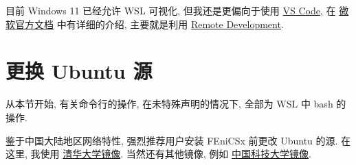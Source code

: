 \documentclass[fontset=founder]{ctexrep}
\begin{document}
目前 Windows 11 已经允许 WSL 可视化,
但我还是更偏向于使用
\href{https://code.visualstudio.com/}{VS Code},
在%
\href{https://learn.microsoft.com/zh-cn/windows/wsl/tutorials/wsl-vscode}{微软官方文档}%
中有详细的介绍,
主要就是利用
\href{https://marketplace.visualstudio.com/items?itemName=ms-vscode-remote.vscode-remote-extensionpack}{Remote Development}.

\section{更换 Ubuntu 源}\label{sec:source}

从本节开始,
有关命令行的操作,
在未特殊声明的情况下,
全部为 WSL 中 \textsf{bash} 的操作.

鉴于中国大陆地区网络特性,
强烈推荐用户安装 FEniCSx 前更改 Ubuntu 的源.
在这里,
我使用%
\href{https://mirrors.tuna.tsinghua.edu.cn/help/ubuntu/}{清华大学镜像}.
当然还有其他镜像,
例如%
\href{https://mirrors.ustc.edu.cn/help/ubuntu.html}{中国科技大学镜像}.
\end{document}
